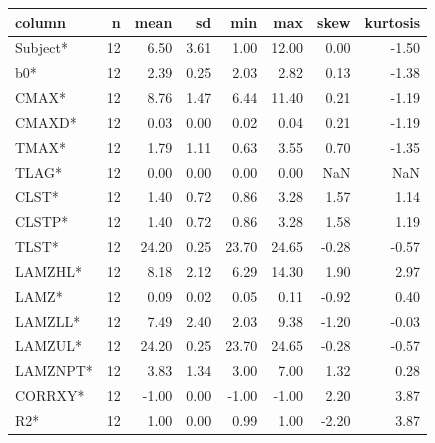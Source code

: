 \documentclass[12pt,]{krantz}
\newenvironment{Shaded}{\begin{snugshade}}{\end{snugshade}}
\newcommand{\KeywordTok}[1]{\textcolor[rgb]{0.13,0.29,0.53}{\textbf{#1}}}
\newcommand{\DataTypeTok}[1]{\textcolor[rgb]{0.13,0.29,0.53}{#1}}
\newcommand{\DecValTok}[1]{\textcolor[rgb]{0.00,0.00,0.81}{#1}}
\newcommand{\StringTok}[1]{\textcolor[rgb]{0.31,0.60,0.02}{#1}}
\newcommand{\OtherTok}[1]{\textcolor[rgb]{0.56,0.35,0.01}{#1}}
\newcommand{\OperatorTok}[1]{\textcolor[rgb]{0.81,0.36,0.00}{\textbf{#1}}}
\newcommand{\NormalTok}[1]{#1}
\theoremstyle{definition}
\theoremstyle{definition}
\theoremstyle{definition}
\theoremstyle{remark}
\begin{document}
\begin{Shaded}
\end{Shaded}

\begin{tabular}{l|r|r|r|r|r|r|r}
\hline
column & n & mean & sd & min & max & skew & kurtosis\\
\hline
Subject* & 12 & 6.50 & 3.61 & 1.00 & 12.00 & 0.00 & -1.50\\
\hline
b0* & 12 & 2.39 & 0.25 & 2.03 & 2.82 & 0.13 & -1.38\\
\hline
CMAX* & 12 & 8.76 & 1.47 & 6.44 & 11.40 & 0.21 & -1.19\\
\hline
CMAXD* & 12 & 0.03 & 0.00 & 0.02 & 0.04 & 0.21 & -1.19\\
\hline
TMAX* & 12 & 1.79 & 1.11 & 0.63 & 3.55 & 0.70 & -1.35\\
\hline
TLAG* & 12 & 0.00 & 0.00 & 0.00 & 0.00 & NaN & NaN\\
\hline
CLST* & 12 & 1.40 & 0.72 & 0.86 & 3.28 & 1.57 & 1.14\\
\hline
CLSTP* & 12 & 1.40 & 0.72 & 0.86 & 3.28 & 1.58 & 1.19\\
\hline
TLST* & 12 & 24.20 & 0.25 & 23.70 & 24.65 & -0.28 & -0.57\\
\hline
LAMZHL* & 12 & 8.18 & 2.12 & 6.29 & 14.30 & 1.90 & 2.97\\
\hline
LAMZ* & 12 & 0.09 & 0.02 & 0.05 & 0.11 & -0.92 & 0.40\\
\hline
LAMZLL* & 12 & 7.49 & 2.40 & 2.03 & 9.38 & -1.20 & -0.03\\
\hline
LAMZUL* & 12 & 24.20 & 0.25 & 23.70 & 24.65 & -0.28 & -0.57\\
\hline
LAMZNPT* & 12 & 3.83 & 1.34 & 3.00 & 7.00 & 1.32 & 0.28\\
\hline
CORRXY* & 12 & -1.00 & 0.00 & -1.00 & -1.00 & 2.20 & 3.87\\
\hline
R2* & 12 & 1.00 & 0.00 & 0.99 & 1.00 & -2.20 & 3.87\\
\hline

\end{tabular}
\end{document}
